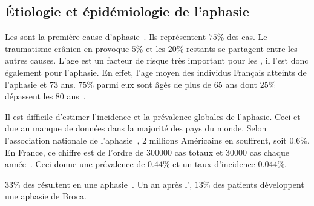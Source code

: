 \subsection{Étiologie et épidémiologie de l'aphasie}

Les  sont la première cause d'aphasie~\cite{Hallowell_2017}. 
Ils représentent \(75\%\) des cas.
Le traumatisme crânien en provoque \(5\%\) 
et les \(20\%\) restants se partagent entre les autres causes.
L'age est un facteur de risque très important pour les ,
il l'est donc également pour l'aphasie. 
En effet, l'age moyen des individus Français atteints de l'aphasie et 73 ans.
\(75\%\) parmi eux sont âgés de plus de 65 ans dont \(25\%\) dépassent les 80 ans~\cite{press}.

Il est difficile d'estimer l'incidence et la prévalence globales de l'aphasie.
Ceci et due au manque de données dans la majorité des pays du monde.
Selon l'association nationale de l'aphasie~\cite{Home}, 2 millions Américains en souffrent, soit \(0.6\%\).
En France, ce chiffre est de l'ordre de 300000 cas totaux et 30000 cas chaque année~\cite{press}.
Ceci donne une prévalence de \(0.44\%\) et un taux d'incidence \(0.044\%\).

\(33\%\) des  résultent en une aphasie~\cite{press}.
Un an après l', \(13\%\) des patients développent une aphasie de Broca.
